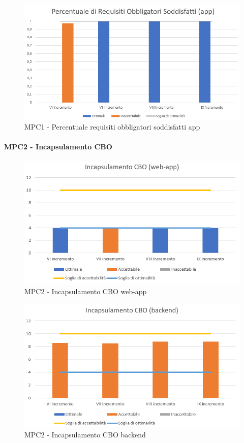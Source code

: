 \begin{figure}[h!]
    \centering
      \includegraphics[scale=1]{Immagini/PercReqObbAPPA.PNG}
    \caption{MPC1 - Percentuale requisiti obbligatori soddisfatti app}
  \end{figure}



  \paragraph{MPC2 - Incapsulamento CBO}
  \begin{figure}[h!]
    \centering
      \includegraphics[scale=1]{Immagini/CBO WAA.PNG}
    \caption{MPC2 - Incapsulamento CBO web-app}
  \end{figure}

  \begin{figure}[h!]
    \centering
      \includegraphics[scale=1]{Immagini/CBO BEA.PNG}
    \caption{MPC2 - Incapsulamento CBO backend}
  \end{figure}

